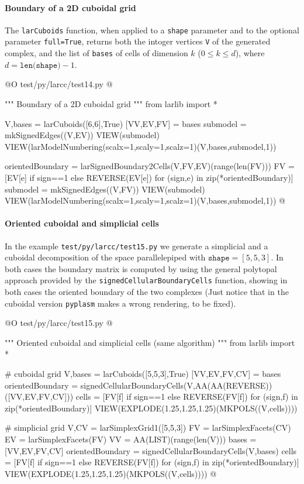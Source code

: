\documentclass[11pt,oneside]{article}    %
\begin{document}
\paragraph{Boundary of a 2D cuboidal grid}
The \texttt{larCuboids} function, when applied to a \texttt{shape} parameter and to the optional parameter \texttt{full=True}, returns both the intoger vertices \texttt{V} of the generated complex, and the list of \texttt{bases} of cells of dimension $k$ ($0\leq k\leq d$), where $d = \texttt{len(shape)}-1$.

@O test/py/larcc/test14.py
@{""" Boundary of a 2D cuboidal grid """
from larlib import *

V,bases = larCuboids([6,6],True)
[VV,EV,FV] = bases
submodel = mkSignedEdges((V,EV))
VIEW(submodel)
VIEW(larModelNumbering(scalx=1,scaly=1,scalz=1)(V,bases,submodel,1))

orientedBoundary = larSignedBoundary2Cells(V,FV,EV)(range(len(FV)))
FV = [EV[e] if sign==1 else REVERSE(EV[e])  for (sign,e) in zip(*orientedBoundary)]
submodel = mkSignedEdges((V,FV))
VIEW(submodel)
VIEW(larModelNumbering(scalx=1,scaly=1,scalz=1)(V,bases,submodel,1))
@}

\paragraph{Oriented cuboidal and simplicial cells}
In the example \texttt{test/py/larcc/test15.py} we generate a simplicial and a cuboidal decomposition of the space parallelepiped with $\texttt{shape}=[5,5,3]$.
In both cases the boundary matrix is computed by using the general polytopal approach provided by the \texttt{signedCellularBoundaryCells} function, showing in both cases the oriented boundary of the two complexes
(Just notice that in the cuboidal version \texttt{pyplasm} makes a wrong rendering, to be fixed).

@O test/py/larcc/test15.py
@{""" Oriented cuboidal and simplicial cells (same algorithm) """
from larlib import *

# cuboidal grid
V,bases = larCuboids([5,5,3],True)
[VV,EV,FV,CV] = bases
orientedBoundary = signedCellularBoundaryCells(V,AA(AA(REVERSE))([VV,EV,FV,CV]))
cells = [FV[f] if sign==1 else REVERSE(FV[f])  for (sign,f) in zip(*orientedBoundary)]
VIEW(EXPLODE(1.25,1.25,1.25)(MKPOLS((V,cells))))

# simplicial grid
V,CV = larSimplexGrid1([5,5,3])
FV = larSimplexFacets(CV)
EV = larSimplexFacets(FV)
VV = AA(LIST)(range(len(V)))
bases = [VV,EV,FV,CV]
orientedBoundary = signedCellularBoundaryCells(V,bases)
cells = [FV[f] if sign==1 else REVERSE(FV[f])  for (sign,f) in zip(*orientedBoundary)]
VIEW(EXPLODE(1.25,1.25,1.25)(MKPOLS((V,cells))))
@}
\end{document}
